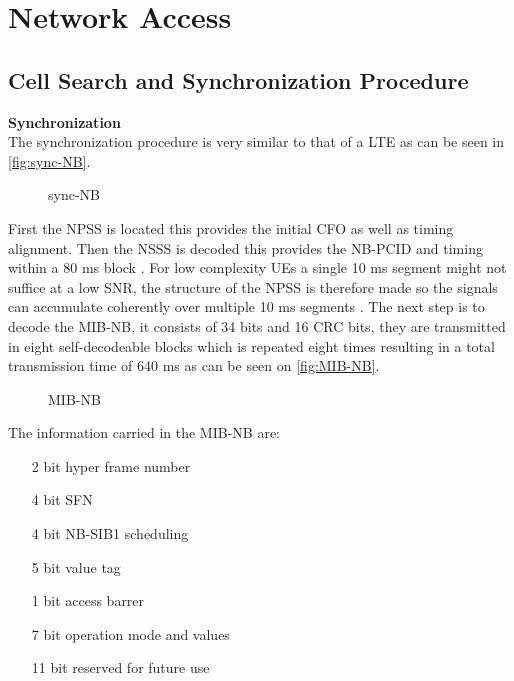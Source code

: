 




\section{Network Access}

\subsection{Cell Search and Synchronization Procedure}


\textbf{Synchronization} \\
The synchronization procedure is very similar to that of a \gls{LTE} as can be seen in \autoref{fig:sync-NB}. 

\begin{figure}[H]
\centering

\caption{sync-NB}
\label{fig:sync-NB}
\end{figure}

First the \gls{NPSS} is located this provides the initial \gls{CFO} as well as timing alignment. Then the \gls{NSSS} is decoded this provides the \gls{NB-PCID} and timing within a 80 ms block \citep{primer}. For low complexity \gls{UE}s a single 10 ms segment might not suffice at a low \gls{SNR}, the structure of the \gls{NPSS} is therefore made so the signals can accumulate coherently over multiple 10 ms segments \citep{primer}. The next step is to decode the \gls{MIB-NB}, it consists of 34 bits and 16 \gls{CRC} bits, they are transmitted in eight self-decodeable blocks which is repeated eight times resulting in a total transmission time of 640 ms as can be seen on \autoref{fig:MIB-NB}. 
 
\begin{figure}[H]
\centering

\caption{MIB-NB}
\label{fig:MIB-NB}
\end{figure}

The information carried in the \gls{MIB-NB} are:

\begin{itemize}
\item[2 bit] hyper frame number
\item[4 bit] \gls{SFN}
\item[4 bit] \gls{NB-SIB}1 scheduling
\item[5 bit] value tag
\item[1 bit] access barrer
\item[7 bit] operation mode and values
\item[11 bit] reserved for future use
\end{itemize}

